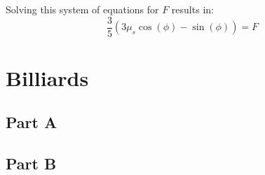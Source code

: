 \documentclass{article}
\begin{document}
Solving this system of equations for $F$ results in:
$$ \frac{ 3 }{ 5 } \left( 3 \mu_{s} \cos \left( \phi \right) - \sin \left( \phi
\right) \right) = F$$

\section{ Billiards }

\subsection*{ Part A }



\subsection*{ Part B }
\end{document}
